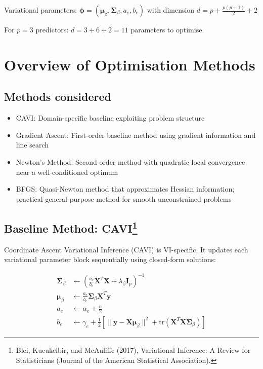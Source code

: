 \documentclass[11pt]{article}
\newcommand{\tr}{\text{tr}}
\begin{document}
Variational parameters: $\bm{\phi} = (\bm{\mu}_\beta, \bm{\Sigma}_\beta, a_e, b_e)$ with dimension $d = p + \frac{p(p+1)}{2} + 2$

For $p=3$ predictors: $d = 3 + 6 + 2 = 11$ parameters to optimise.
 
\section*{Overview of Optimisation Methods}

\subsection*{Methods considered}

\begin{itemize}
\item CAVI: Domain-specific baseline exploiting problem structure
\item Gradient Ascent: First-order baseline method using gradient information and line search
\item Newton's Method: Second-order method with quadratic local convergence near a well-conditioned optimum
\item BFGS: Quasi-Newton method that approximates Hessian information; practical general-purpose method for smooth unconstrained problems
\end{itemize}

\subsection*{Baseline Method: CAVI\footnote{Blei, Kucukelbir, and McAuliffe (2017), Variational Inference: A Review for Statisticians (Journal of the American Statistical Association).}}

Coordinate Ascent Variational Inference (CAVI) is VI-specific. It updates each variational parameter block sequentially using closed-form solutions:

\begin{align}
\bm{\Sigma}_\beta &\leftarrow \left(\frac{a_e}{b_e} \bm{X}^T\bm{X} + \lambda_\beta \bm{I}_p\right)^{-1}\\
\bm{\mu}_\beta &\leftarrow \frac{a_e}{b_e} \bm{\Sigma}_\beta \bm{X}^T\bm{y}\\
a_e &\leftarrow \alpha_e + \frac{n}{2}\\
b_e &\leftarrow \gamma_e + \frac{1}{2}\left[\|\bm{y} - \bm{X}\bm{\mu}_\beta\|^2 + \tr(\bm{X}^T\bm{X}\bm{\Sigma}_\beta)\right]
\end{align}
\end{document}
